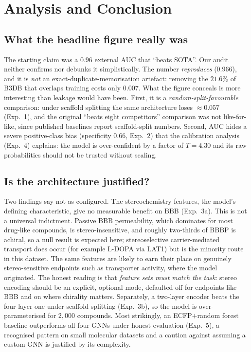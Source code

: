 \documentclass[conference]{IEEEtran}
\begin{document}
\section{Analysis and Conclusion}

\subsection{What the headline figure really was}
The starting claim was a $0.96$ external AUC that ``beats SOTA''. Our audit
neither confirms nor debunks it simplistically. The number \emph{reproduces}
($0.966$), and it is \emph{not} an exact-duplicate-memorisation artefact: removing
the $21.6\%$ of B3DB that overlaps training costs only $0.007$. What the figure
conceals is more interesting than leakage would have been. First, it is a
\emph{random-split-favourable} comparison: under scaffold splitting the same
architecture loses $\approx 0.057$ (Exp.~1), and the original ``beats eight
competitors'' comparison was not like-for-like, since published baselines report
scaffold-split numbers. Second, AUC hides a severe positive-class bias
(specificity $0.66$, Exp.~2) that the calibration analysis (Exp.~4) explains: the
model is over-confident by a factor of $T=4.30$ and its raw probabilities should
not be trusted without scaling.

\subsection{Is the architecture justified?}
Two findings say not as configured. The stereochemistry features, the model's
defining characteristic, give no measurable benefit on BBB (Exp.~3a). This is not
a universal indictment. Passive BBB permeability, which dominates for most
drug-like compounds, is stereo-insensitive, and roughly two-thirds of BBBP is
achiral, so a null result is expected here; stereoselective carrier-mediated
transport does occur (for example L-DOPA via LAT1) but is the minority route in
this dataset. The same features are likely to earn their place on genuinely
stereo-sensitive endpoints such as transporter activity, where the model
originated. The honest reading is that \emph{feature sets must match the
task}: stereo encoding should be an explicit, optional mode, defaulted off for
endpoints like BBB and on where chirality matters. Separately, a two-layer encoder
beats the four-layer one under scaffold splitting (Exp.~3b), so the model is
over-parameterised for $2{,}000$ compounds. Most strikingly, an ECFP$+$random
forest baseline outperforms all four GNNs under honest evaluation (Exp.~5), a
recognised pattern on small molecular datasets and a caution against assuming a
custom GNN is justified by its complexity.
\end{document}
